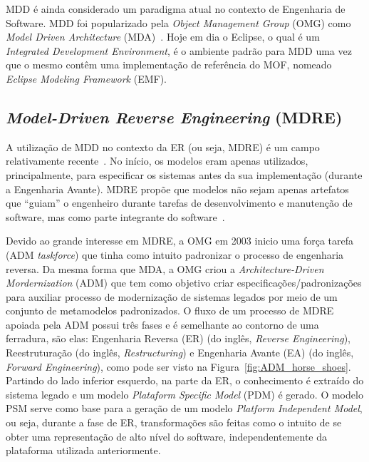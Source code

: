 MDD é ainda considerado um paradigma atual no contexto de Engenharia de Software. MDD foi popularizado pela \textit{Object Management Group} (OMG) como \textit{Model Driven Architecture} (MDA)~\citep{Kleppe:2003}. Hoje em dia o Eclipse, o qual é um \textit{Integrated Development Environment}, é o ambiente padrão para MDD uma vez que o mesmo contêm uma implementação de referência do MOF, nomeado \textit{Eclipse Modeling Framework} (EMF).

\subsection{\textit{Model-Driven Reverse Engineering} (MDRE)}\label{sec:model_driven_reverse_engineering}

A utilização de MDD no contexto da ER (ou seja, MDRE) é um campo relativamente recente~\citep{Model_Driven_Reverse_Engineering}. No início, os modelos eram apenas utilizados, principalmente, para especificar os sistemas antes da sua implementação (durante a Engenharia Avante). MDRE propõe que modelos não sejam apenas artefatos que ``guiam'' o engenheiro durante tarefas de desenvolvimento e manutenção de software, mas como parte integrante do software~\citep{ThomasMDD}.


Devido ao grande interesse em MDRE, a OMG em 2003 inicio uma força tarefa (ADM \textit{taskforce}) que tinha como intuito padronizar o processo de engenharia reversa. Da mesma forma que MDA, a OMG criou a \textit{Architecture-Driven Mordernization} (ADM) que tem como objetivo criar especificações/padronizações para auxiliar processo de modernização de sistemas legados por meio de um conjunto de metamodelos padronizados. O fluxo de um processo de MDRE apoiada pela ADM possui três fases e é semelhante ao contorno de uma ferradura, são elas: Engenharia Reversa (ER) (do inglês, \textit{Reverse Engineering}), Reestruturação (do inglês, \textit{Restructuring}) e Engenharia Avante (EA) (do inglês, \textit{Forward Engineering}), como pode ser visto na Figura~\ref{fig:ADM_horse_shoes}. Partindo do lado inferior esquerdo, na parte da ER, o conhecimento é extraído do sistema legado e um modelo \textit{Plataform Specific Model} (PDM) é gerado. O modelo PSM serve como base para a geração de um modelo \textit{Platform Independent Model}, ou seja, durante a fase de ER, transformações são feitas como o intuito de se obter uma representação de alto nível do software, independentemente da plataforma utilizada anteriormente.

